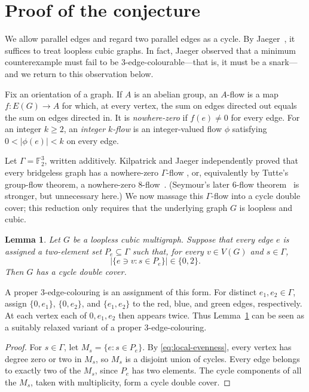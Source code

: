 \documentclass{amsart}
\newtheorem{lemma}[theorem]{Lemma}
\newcommand{\F}{\mathbb{F}}
\begin{document}
\section{Proof of the conjecture}

We allow parallel edges and regard two parallel edges as a cycle. By
Jaeger~\cite[Proposition~4]{Jaeger1985}, it suffices to treat loopless cubic
graphs. In fact, Jaeger observed that a minimum counterexample must fail to be
3-edge-colourable---that is, it must be a snark---and we return to this
observation below.

Fix an orientation of a graph. If $A$ is an abelian group, an $A$-flow is a
map $f:E(G)\to A$ for which, at every vertex, the sum on edges directed out
equals the sum on edges directed in. It is \emph{nowhere-zero} if $f(e)\ne 0$
for every edge. For an integer $k\ge 2$, an \emph{integer $k$-flow} is an
integer-valued flow $\phi$ satisfying $0<|\phi(e)|<k$ on every edge.

Let $\Gamma=\F_2^3$, written additively. Kilpatrick and Jaeger independently
proved that every bridgeless graph has a nowhere-zero $\Gamma$-flow
\cite{Kilpatrick1975,Jaeger1976}, or, equivalently by Tutte's group-flow
theorem, a nowhere-zero 8-flow~\cite{Tutte1954}. (Seymour's later 6-flow
theorem~\cite{Seymour1981} is stronger, but unnecessary here.) We now massage
this $\Gamma$-flow into a cycle double cover; this reduction only requires that
the underlying graph $G$ is loopless and cubic.

\begin{lemma}\label{lem:pair-labeling}
Let $G$ be a loopless cubic multigraph. Suppose that every edge $e$ is assigned
a two-element set $P_e\subseteq\Gamma$ such that, for every $v\in V(G)$ and
$s\in\Gamma$,
\begin{equation}\label{eq:local-evenness}
  \bigl|\{e\ni v:s\in P_e\}\bigr|\in\{0,2\}.
\end{equation}
Then $G$ has a cycle double cover.
\end{lemma}

A proper 3-edge-colouring is an assignment of this form. For distinct
$e_1,e_2\in\Gamma$, assign $\{0,e_1\}$, $\{0,e_2\}$, and $\{e_1,e_2\}$ to the
red, blue, and green edges, respectively. At each vertex each of $0,e_1,e_2$
then appears twice. Thus Lemma~\ref{lem:pair-labeling} can be seen as a suitably
relaxed variant of a proper 3-edge-colouring.

\begin{proof}
For $s\in\Gamma$, let $M_s=\{e:s\in P_e\}$. By
\eqref{eq:local-evenness}, every vertex has degree zero or two in $M_s$, so
$M_s$ is a disjoint union of cycles. Every edge belongs to exactly two of the
$M_s$, since $P_e$ has two elements. The cycle components of all the $M_s$,
taken with multiplicity, form a cycle double cover.
\end{proof}
\end{document}
